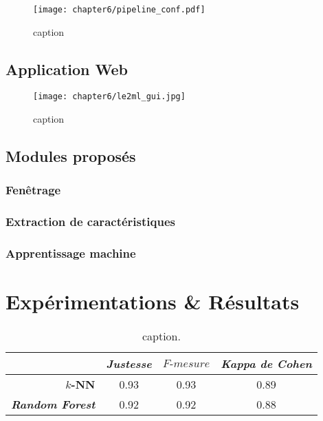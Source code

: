 \begin{figure}[H]
	\centering
	\texttt{[image: chapter6/pipeline\_conf.pdf]}
        \caption{caption}
	\label{fig:pipeline_conf}
\end{figure}

\subsection{Application Web}

\begin{figure}[H]
	\centering
	\texttt{[image: chapter6/le2ml\_gui.jpg]}
        \caption{caption}
	\label{fig:le2ml_gui}
\end{figure}

\subsection{Modules proposés}

\subsubsection{Fenêtrage}

\subsubsection{Extraction de caractéristiques}

\subsubsection{Apprentissage machine}

\section{Expérimentations \& Résultats}

\begin{table}[H]
    \centering
    \caption{caption.}
    \label{tab:previous_results}
    \begin{tabular}{@{}rccc@{}}
      \toprule
      \multicolumn{1}{l}{}              & \textit{Justesse}  &  $F\mbox{-} mesure$  & \textit{Kappa de Cohen}  \\ \midrule
      \textbf{$k$-NN}                   & 0.93               & 0.93                 & 0.89                     \\
      \textbf{\textit{Random Forest}}   & 0.92               & 0.92                 & 0.88                     \\ \bottomrule
    \end{tabular}
\end{table}

